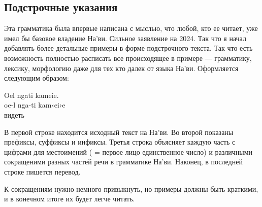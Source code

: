 \subsection{Подстрочные указания}
Эта грамматика была впервые написана с мыслью, что любой, кто ее
читает,
уже имел бы базовое владение На'ви. Сильное заявление на 2024.
Так что я начал добавлять более детальные примеры в форме
подстрочного текста. Так что есть возможность полностью
расписать все происходящее в примере — грамматику, лексику,
морфологию даже для тех кто далек от языка На'ви. Оформляется
следующим образом:

\begin{interlin}
 \glll Oel ngati kameie. \\
     oe-l nga-ti kam‹ei›e \\
       видеть \\
\end{interlin}

\noindent В первой строке находится исходный текст на На'ви. Во
второй показаны префиксы, суффиксы и инфиксы. Третья строка
объясняет каждую часть с цифрами для местоимений ( =
первое лицо
единственное число) и различными сокращеними разных частей речи в
грамматике На'ви. Наконец, в последней строке пишется перевод.

К сокращениям нужно немного привыкнуть, но примеры должны быть
краткими, и в конечном итоге их будет легче читать.

